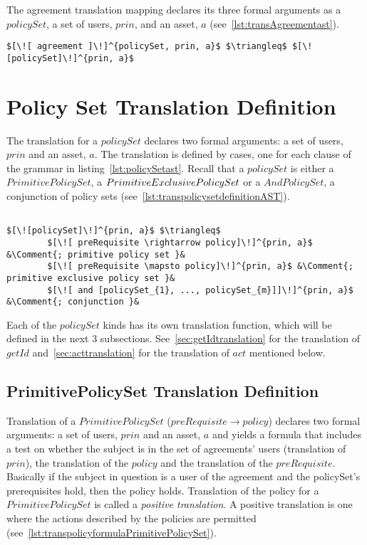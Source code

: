 The agreement translation mapping declares its three formal arguments as a $policySet$, a set of users, $prin$, and an asset, $a$ (see~\ref{lst:transAgreementast}).


\lstset{mathescape, language=AST}  
\begin{lstlisting}[frame=single, caption={Agreement Translation},label={lst:transAgreementast}]
$[\![ agreement ]\!]^{policySet, prin, a}$ $\triangleq$ $[\![policySet]\!]^{prin, a}$
\end{lstlisting}

\section{Policy Set Translation Definition}
The translation for a $policySet$ declares two formal arguments: a set of users, $prin$ and an asset, $a$.
The translation is defined by cases, one for each clause of the grammar in listing~\ref{lst:policySetast}. Recall that a $policySet$ is either a $PrimitivePolicySet$, a $\linebreak PrimitiveExclusivePolicySet$ or a $AndPolicySet$, a conjunction of policy sets (see~\ref{lst:transpolicysetdefinitionAST}).

\lstset{mathescape, language=AST}  
\begin{lstlisting}[frame=single, caption={Policy Set Translation Cases},label={lst:transpolicysetdefinitionAST}]

$[\![policySet]\!]^{prin, a}$ $\triangleq$ 
        $[\![ preRequisite \rightarrow policy]\!]^{prin, a}$ &\Comment{; primitive policy set }&
        $[\![ preRequisite \mapsto policy]\!]^{prin, a}$ &\Comment{; primitive exclusive policy set }&
        $[\![ and [policySet_{1}, ..., policySet_{m}]]\!]^{prin, a}$ &\Comment{; conjunction }&

\end{lstlisting}


Each of the $policySet$ kinds has its own translation function, which will be defined in the next 3 subsections. See~\ref{sec:getIdtranslation} for the translation of $getId$ and~\ref{sec:acttranslation} for the translation of $act$ mentioned below.


\subsection{PrimitivePolicySet Translation Definition}
Translation of a $PrimitivePolicySet$ ($preRequisite \rightarrow policy$) declares two formal arguments: a set of users, $prin$ and an asset, $a$ and yields a formula that includes a test on whether the subject is in the set of agreements' users (translation of $prin$), the translation of the $policy$ and the translation of the $preRequisite$. Basically if the subject in question is a user of the agreement and the policySet's prerequisites hold, then the policy holds. Translation of the policy for a $PrimitivePolicySet$ is called a \emph{positive translation}. A positive translation is one where the actions described by the policies are permitted (see~\ref{lst:transpolicyformulaPrimitivePolicySet}).   

